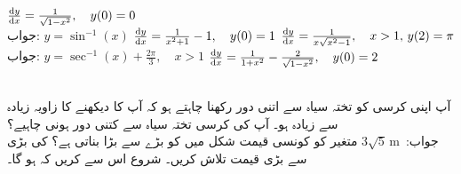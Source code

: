 $\tfrac{\dif y}{\dif x}=\tfrac{1}{\sqrt{1-x^2}},\quad y(0)=0$\\
جواب:\quad
$y=\sin^{-1}(x)$
$\tfrac{\dif y}{\dif x}=\tfrac{1}{x^2+1}-1,\quad y(0)=1$
$\tfrac{\dif y}{\dif x}=\tfrac{1}{x\sqrt{x^2-1}},\quad x>1,\, y(2)=\pi$\\
جواب:\quad
$y=\sec^{-1}(x)+\tfrac{2\pi}{3},\quad x>1$
$\tfrac{\dif y}{\dif x}=\tfrac{1}{1+x^2}-\tfrac{2}{\sqrt{1-x^2}},\quad y(0)=2$

\\
آپ اپنی کرسی کو تختہ سیاہ سے اتنی دور رکھنا چاہتے ہو کہ آپ کا دیکھنے کا زاویہ  زیادہ سے زیادہ ہو۔ آپ کی کرسی تختہ سیاہ سے کتنی دور ہونی چاہیے؟\\
جواب:\quad\
$3\sqrt{5}\,\si{\meter}$
متغیر  کو کونسی قیمت شکل  میں  کو بڑے سے بڑا بناتی ہے؟  کی بڑی سے بڑی  قیمت تلاش کریں۔ شروع اس سے کریں کہ  ہو گا۔
\انتہا{سوال}
